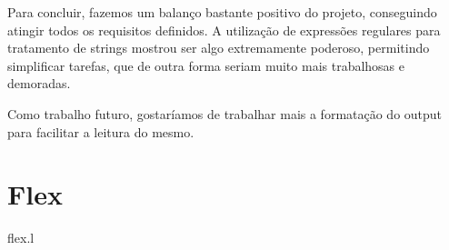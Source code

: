 \documentclass[a4paper]{report}
\begin{document}
Para concluir, fazemos um balanço bastante positivo do projeto, conseguindo
atingir todos os requisitos definidos. A utilização de expressões regulares
para tratamento de strings mostrou ser algo extremamente poderoso, permitindo
simplificar tarefas, que de outra forma seriam muito mais trabalhosas e demoradas.

Como trabalho futuro, gostaríamos de trabalhar mais a formatação do output
para facilitar a leitura do mesmo.

\appendix

\chapter{Flex}


{flex.l}
\end{document}
